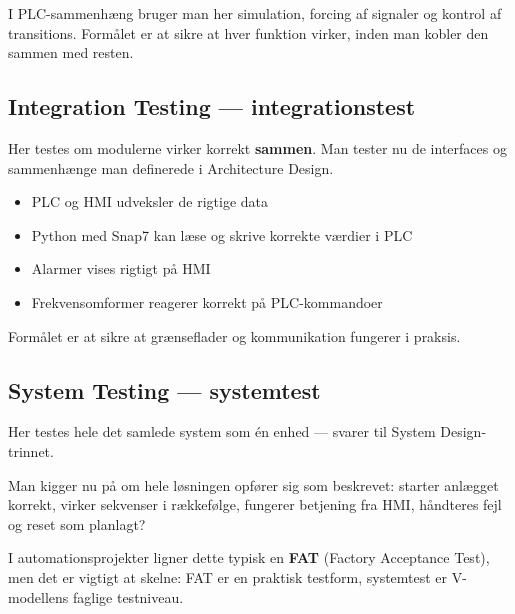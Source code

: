 \documentclass[12pt, a4paper]{article}
\begin{document}
I PLC-sammenhæng bruger man her simulation, forcing af signaler og kontrol af transitions.
Formålet er at sikre at hver funktion virker, inden man kobler den sammen med resten.

\subsection{Integration Testing --- integrationstest}

Her testes om modulerne virker korrekt \textbf{sammen}.
Man tester nu de interfaces og sammenhænge man definerede i Architecture Design.

\begin{tcolorbox}[infobox, title={\faListUl\quad Eksempler}]
\begin{itemize}[leftmargin=1.2em, itemsep=2pt]
  \item PLC og HMI udveksler de rigtige data
  \item Python med Snap7 kan læse og skrive korrekte værdier i PLC
  \item Alarmer vises rigtigt på HMI
  \item Frekvensomformer reagerer korrekt på PLC-kommandoer
\end{itemize}
\end{tcolorbox}

Formålet er at sikre at grænseflader og kommunikation fungerer i praksis.

\subsection{System Testing --- systemtest}

Her testes hele det samlede system som én enhed --- svarer til System Design-trinnet.

Man kigger nu på om hele løsningen opfører sig som beskrevet: starter anlægget korrekt, virker sekvenser i rækkefølge, fungerer betjening fra HMI, håndteres fejl og reset som planlagt?

\begin{tcolorbox}[infobox, title={\faInfoCircle\quad FAT og systemtest}]
I automationsprojekter ligner dette typisk en \textbf{FAT} (Factory Acceptance Test), men det er vigtigt at skelne: FAT er en praktisk testform, systemtest er V-modellens faglige testniveau.
\end{tcolorbox}
\end{document}
